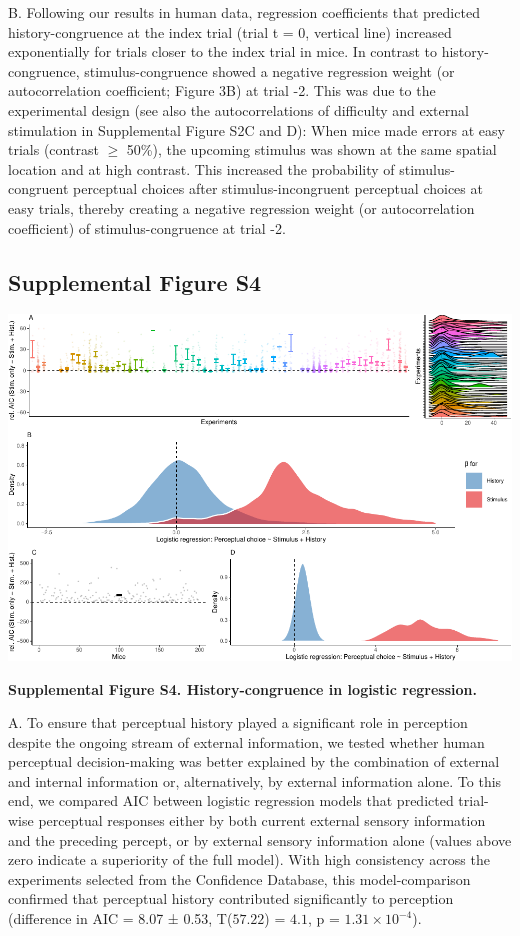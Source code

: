 \documentclass[
]{article}
\begin{document}
B. Following our results in human data, regression coefficients that
predicted history-congruence at the index trial (trial t = 0, vertical
line) increased exponentially for trials closer to the index trial in
mice. In contrast to history-congruence, stimulus-congruence showed a
negative regression weight (or autocorrelation coefficient; Figure 3B)
at trial -2. This was due to the experimental design (see also the
autocorrelations of difficulty and external stimulation in Supplemental
Figure S2C and D): When mice made errors at easy trials (contrast
\(\geq\) 50\%), the upcoming stimulus was shown at the same spatial
location and at high contrast. This increased the probability of
stimulus-congruent perceptual choices after stimulus-incongruent
perceptual choices at easy trials, thereby creating a negative
regression weight (or autocorrelation coefficient) of
stimulus-congruence at trial -2.

\newpage

\hypertarget{supplemental-figure-s4}{%
\subsection{Supplemental Figure S4}\label{supplemental-figure-s4}}

\includegraphics{modes_mouse_rev1b_files/figure-latex/Supplememtal_Figure_S4-1.pdf}

\textbf{Supplemental Figure S4. History-congruence in logistic
regression.}

A. To ensure that perceptual history played a significant role in
perception despite the ongoing stream of external information, we tested
whether human perceptual decision-making was better explained by the
combination of external and internal information or, alternatively, by
external information alone. To this end, we compared AIC between
logistic regression models that predicted trial-wise perceptual
responses either by both current external sensory information and the
preceding percept, or by external sensory information alone (values
above zero indicate a superiority of the full model). With high
consistency across the experiments selected from the Confidence
Database, this model-comparison confirmed that perceptual history
contributed significantly to perception (difference in AIC = 8.07 ±
0.53, T(\(57.22\)) = \(4.1\), p = \(\ensuremath{1.31\times 10^{-4}}\)).
\end{document}
